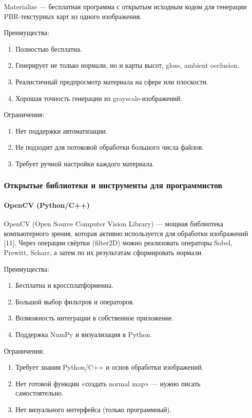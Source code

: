 Materialize — бесплатная программа с открытым исходным кодом для генерации PBR-текстурных карт из одного изображения.

Преимущества:
\begin{enumerate}
	\item Полностью бесплатна.
	\item Генерирует не только нормали, но и карты высот, gloss, ambient occlusion.
	\item Реалистичный предпросмотр материала на сфере или плоскости.
	\item Хорошая точность генерации из grayscale-изображений.
\end{enumerate}

Ограничения:
\begin{enumerate}
	\item Нет поддержки автоматизации.
	\item Не подходит для потоковой обработки большого числа файлов.
	\item Требует ручной настройки каждого материала.
\end{enumerate}
\subsubsection{Открытые библиотеки и инструменты для программистов}
\paragraph{OpenCV (Python/C++)}

OpenCV (Open Source Computer Vision Library) — мощная библиотека компьютерного зрения, которая активно используется для обработки изображений [11]. Через операции свёртки (filter2D) можно реализовать операторы Sobel, Prewitt, Scharr, а затем по их результатам сформировать нормали.

Преимущества:
\begin{enumerate}
	\item Бесплатна и кроссплатформенна.
	\item Большой выбор фильтров и операторов.
	\item Возможность интеграции в собственное приложение.
	\item Поддержка NumPy и визуализация в Python.
\end{enumerate}

Ограничения:
\begin{enumerate}
	\item Требует знания Python/C++ и основ обработки изображений.
	\item Нет готовой функции «создать normal map» — нужно писать самостоятельно.
	\item Нет визуального интерфейса (только программный).
\end{enumerate}

